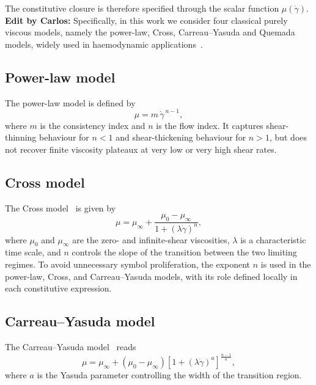 \documentclass[lineno]{jfm}
\newcommand{\cbp}[1]{{\color{blue} \textbf{Edit by Carlos:} #1}}
\begin{document}
The constitutive closure is therefore specified through the scalar function $\mu(\dot{\gamma})$. \cbp{Specifically, in this work we consider four classical purely viscous models, namely the power-law, Cross, Carreau--Yasuda and Quemada models, widely used in haemodynamic applications~\citep{Quemada1977,Popel2005,Neofytou2004,Mimouni2016}.}

\subsection{Power-law model}

The power-law model is defined by
\begin{equation}
\mu=m\,\dot{\gamma}^{\,n-1},\label{eq:pl}
\end{equation}
where $m$ is the consistency index and $n$ is the flow index. It captures shear-thinning behaviour for $n<1$ and shear-thickening behaviour for $n>1$, but does not recover finite viscosity plateaux at very low or very high shear rates.

\subsection{Cross model}

The Cross model~\citep{Cross1965} is given by
\begin{equation}
\mu=\mu_{\infty}+\frac{\mu_{0}-\mu_{\infty}}{1+(\lambda\dot{\gamma})^{n}},\label{eq:cross}
\end{equation}
where $\mu_{0}$ and $\mu_{\infty}$ are the zero- and infinite-shear viscosities, $\lambda$ is a characteristic time scale, and $n$ controls the slope of the transition between the two limiting regimes. To avoid unnecessary symbol proliferation, the exponent $n$ is used in the power-law, Cross, and Carreau--Yasuda models, with its role defined locally in each constitutive expression.

\subsection{Carreau--Yasuda model}

The Carreau--Yasuda model~\citep{Carreau1972,Yasuda1981} reads
\begin{equation}
\mu=\mu_{\infty}+(\mu_{0}-\mu_{\infty})\left[1+(\lambda\dot{\gamma})^{a}\right]^{\frac{n-1}{a}},\label{eq:carreau-yasuda}
\end{equation}
where $a$ is the Yasuda parameter controlling the width of the transition region.
\end{document}
